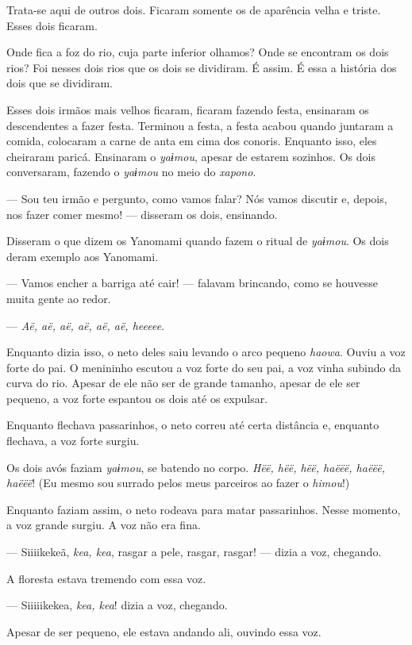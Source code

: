 Trata-se aqui de outros dois. Ficaram somente os de aparência velha e triste. Esses dois ficaram.

Onde fica a foz do rio, cuja parte inferior olhamos? Onde se encontram
os dois rios? Foi nesses dois rios que os dois se dividiram. É assim. É essa 
a história dos dois que se dividiram. 

Esses dois irmãos mais velhos ficaram, ficaram fazendo festa, ensinaram
os descendentes a fazer festa. Terminou a festa, a festa acabou quando
juntaram a comida, colocaram a carne de anta em cima dos conoris.
Enquanto isso, eles cheiraram paricá. Ensinaram o \textit{yaɨmou}, 
apesar de estarem sozinhos. Os dois conversaram, fazendo o \textit{yaɨmou} no meio do \textit{xapono}. 

--- Sou teu irmão e pergunto, como vamos falar? Nós vamos discutir e,
depois, nos fazer comer mesmo! --- disseram os dois, ensinando. 

Disseram o que dizem os Yanomami quando fazem o ritual de \textit{yaɨmou}.
Os dois deram exemplo aos Yanomami. 

--- Vamos encher a barriga até cair! --- falavam brincando, como se
houvesse muita gente ao redor. 

--- \textit{Aë, aë, aë, aë, aë, aë, heeeee}. 

Enquanto dizia isso, o neto deles saiu levando o arco pequeno \textit{haowa}.
Ouviu a voz forte do pai. O menininho escutou a voz forte do seu pai, a
voz vinha subindo da curva do rio. Apesar de ele não ser de grande
tamanho, apesar de ele ser pequeno, a voz forte espantou os dois até os
expulsar. 

Enquanto flechava passarinhos, o neto correu até certa distância e,
enquanto flechava, a voz forte surgiu. 

Os dois avós faziam \textit{yaɨmou}, se batendo no
corpo. \textit{Hëë, hëë, hëë, haëëë, haëëë, haëëë}! (Eu mesmo sou surrado
pelos meus parceiros ao fazer o \textit{himou}!) 

Enquanto faziam assim, o neto rodeava para matar passarinhos. Nesse
momento, a voz grande surgiu. A voz não era fina. 

--- Siiiikekeã, \textit{kea, kea}, rasgar a pele, rasgar, rasgar! --- dizia
a voz, chegando. 

A floresta estava tremendo com essa voz. 

--- Siiiiikekea, \textit{kea, kea}! dizia a voz, chegando. 

Apesar de ser pequeno, ele estava andando ali, ouvindo essa voz. 

